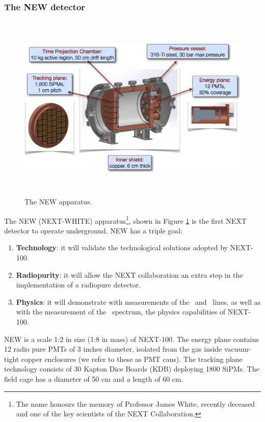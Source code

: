 
\subsubsection*{The NEW detector}
\label{sec.new}

\begin{figure}
\centering
\includegraphics[height=9cm]{img/NEW.png}
\caption{The NEW apparatus.} \label{fig:NEW}
\end{figure} 

The NEW (NEXT-WHITE) apparatus\footnote{The name honours the memory of Professor James White, recently deceased and one of the key scientists of the NEXT Collaboration.}, shown in Figure \ref{fig:NEW} is the first NEXT detector to operate underground. NEW has a triple goal:

\begin{enumerate}
\item {\bf Technology}: it will validate the technological solutions adopted by NEXT-100.
\item {\bf Radiopurity}: it will allow the NEXT collaboration an extra step in the implementation of a radiopure detector.
\item {\bf Physics}: it will demonstrate with measurements of the \BI\ and \TL\ lines, as well as with the measurement of the \bbtnu\ spectrum, the physics capabilities of NEXT-100.
\end{enumerate}

NEW is a scale 1:2 in size (1:8 in mass) of NEXT-100. The energy plane contains 12 radio pure PMTs
of 3 inches diameter, isolated from the gas inside vacuum-tight copper enclosures (we refer to these as PMT cans). The tracking plane technology consists of 30 Kapton Dice Boards (KDB) deploying 1800 SiPMs. The field cage has a diameter of 50 cm and a length of 60 cm. 

